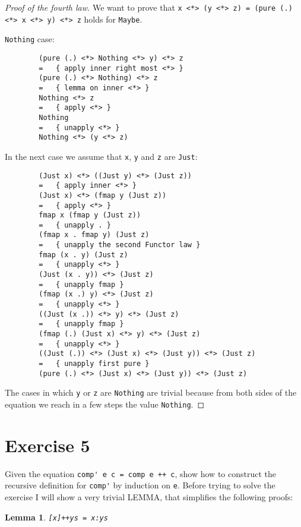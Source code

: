\documentclass[a4paper]{scrartcl}
\newtheorem{lem}{Lemma}
\newcommand{\haskellCode}[1]{\lstinline|#1|}
\begin{document}
\begin{proof}[Proof of the fourth law]
	We want to prove that \verb|x <*> (y <*> z) = (pure (.) <*> x <*> y) <*> z| holds for \verb|Maybe|.
	
	\verb|Nothing| case:
	
	\begin{verbatim}
		(pure (.) <*> Nothing <*> y) <*> z
		=   { apply inner right most <*> }
		(pure (.) <*> Nothing) <*> z
		=   { lemma on inner <*> }
		Nothing <*> z
		=   { apply <*> }
		Nothing
		=   { unapply <*> }
		Nothing <*> (y <*> z)
	\end{verbatim}
	
	In the next case we assume that \verb|x|, \verb|y| and \verb|z| are \verb|Just|:
	
	\begin{verbatim}
		(Just x) <*> ((Just y) <*> (Just z))
		=   { apply inner <*> }
		(Just x) <*> (fmap y (Just z))
		=   { apply <*> }
		fmap x (fmap y (Just z))
		=   { unapply . }
		(fmap x . fmap y) (Just z)
		=   { unapply the second Functor law }
		fmap (x . y) (Just z)
		=   { unapply <*> }
		(Just (x . y)) <*> (Just z)
		=   { unapply fmap }
		(fmap (x .) y) <*> (Just z)
		=   { unapply <*> }
		((Just (x .)) <*> y) <*> (Just z)
		=   { unapply fmap }
		(fmap (.) (Just x) <*> y) <*> (Just z)
		=   { unapply <*> }
		((Just (.)) <*> (Just x) <*> (Just y)) <*> (Just z)
		=   { unapply first pure }
		(pure (.) <*> (Just x) <*> (Just y)) <*> (Just z)
	\end{verbatim}
	
The cases in which \verb|y| or \verb|z| are \verb|Nothing| are trivial because from
both sides of the equation we reach in a few steps the value \verb|Nothing|.

\end{proof}



\section*{Exercise 5}
Given the equation \haskellCode{comp' e c = comp e ++ c}, show how to construct the recursive definition
for \haskellCode{comp'} by induction on \haskellCode{e}.
Before trying to solve the exercise I will show a very trivial LEMMA, that simplifies the following proofs:
\begin{lem}
	\label{lem:trivial}
	\haskellCode{[x]++ys = x:ys}
\end{lem}
\end{document}
